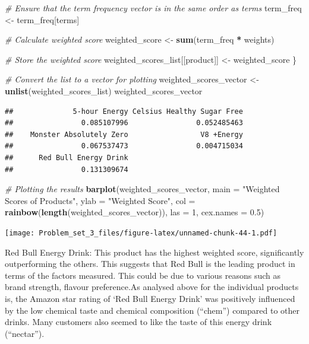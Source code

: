 \documentclass[
]{article}
\newenvironment{Shaded}{\begin{snugshade}}{\end{snugshade}}
\newcommand{\AttributeTok}[1]{\textcolor[rgb]{0.13,0.29,0.53}{#1}}
\newcommand{\CommentTok}[1]{\textcolor[rgb]{0.56,0.35,0.01}{\textit{#1}}}
\newcommand{\DecValTok}[1]{\textcolor[rgb]{0.00,0.00,0.81}{#1}}
\newcommand{\FloatTok}[1]{\textcolor[rgb]{0.00,0.00,0.81}{#1}}
\newcommand{\FunctionTok}[1]{\textcolor[rgb]{0.13,0.29,0.53}{\textbf{#1}}}
\newcommand{\NormalTok}[1]{#1}
\newcommand{\OtherTok}[1]{\textcolor[rgb]{0.56,0.35,0.01}{#1}}
\newcommand{\SpecialCharTok}[1]{\textcolor[rgb]{0.81,0.36,0.00}{\textbf{#1}}}
\newcommand{\StringTok}[1]{\textcolor[rgb]{0.31,0.60,0.02}{#1}}
\begin{document}
\begin{Shaded}
\begin{Highlighting}[]
  \CommentTok{\# Ensure that the term frequency vector is in the same order as \textquotesingle{}terms\textquotesingle{}}
\NormalTok{  term\_freq }\OtherTok{\textless{}{-}}\NormalTok{ term\_freq[terms]}

  \CommentTok{\# Calculate weighted score}
\NormalTok{  weighted\_score }\OtherTok{\textless{}{-}} \FunctionTok{sum}\NormalTok{(term\_freq }\SpecialCharTok{*}\NormalTok{ weights)}

  \CommentTok{\# Store the weighted score}
\NormalTok{  weighted\_scores\_list[[product]] }\OtherTok{\textless{}{-}}\NormalTok{ weighted\_score}
\NormalTok{\}}

\CommentTok{\# Convert the list to a vector for plotting}
\NormalTok{weighted\_scores\_vector }\OtherTok{\textless{}{-}} \FunctionTok{unlist}\NormalTok{(weighted\_scores\_list)}
\NormalTok{weighted\_scores\_vector}
\end{Highlighting}
\end{Shaded}

\begin{verbatim}
##              5-hour Energy Celsius Healthy Sugar Free 
##                0.085107996                0.052485463 
##    Monster Absolutely Zero                 V8 +Energy 
##                0.067537473                0.004715034 
##      Red Bull Energy Drink 
##                0.131309674
\end{verbatim}

\begin{Shaded}
\begin{Highlighting}[]
\CommentTok{\# Plotting the results}
\FunctionTok{barplot}\NormalTok{(weighted\_scores\_vector, }\AttributeTok{main =} \StringTok{"Weighted Scores of Products"}\NormalTok{, }
        \AttributeTok{ylab =} \StringTok{"Weighted Score"}\NormalTok{, }\AttributeTok{col =} \FunctionTok{rainbow}\NormalTok{(}\FunctionTok{length}\NormalTok{(weighted\_scores\_vector)),}
        \AttributeTok{las =} \DecValTok{1}\NormalTok{,}
        \AttributeTok{cex.names =} \FloatTok{0.5}\NormalTok{) }
\end{Highlighting}
\end{Shaded}

\texttt{[image: Problem\_set\_3\_files/figure-latex/unnamed-chunk-44-1.pdf]}

Red Bull Energy Drink: This product has the highest weighted score,
significantly outperforming the others. This suggests that Red Bull is
the leading product in terms of the factors measured. This could be due
to various reasons such as brand strength, flavour preference.As
analysed above for the individual products is, the Amazon star rating of
`Red Bull Energy Drink' was positively influenced by the low chemical
taste and chemical composition (``chem'') compared to other drinks. Many
customers also seemed to like the taste of this energy drink
(``nectar'').
\end{document}
